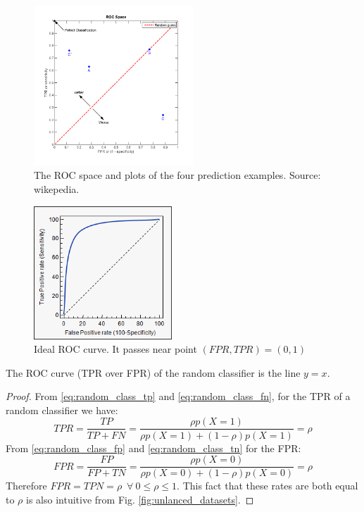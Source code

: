 \documentclass[a4paper]{article}
\begin{document}
\begin{multicols}{2}
\begin{figure}[H]
    \centering
    \includegraphics[height=6cm]{img/roc_space.png}
    \caption{The ROC space and plots of the four prediction examples. Source: wikepedia.}
\end{figure}
\columnbreak
\begin{figure}[H]
    \centering
    \includegraphics[height=5cm]{img/ideal_roc_curve.png}
    \caption{Ideal ROC curve. It passes near  point $(FPR,TPR)=(0,1)$}
\end{figure}
\end{multicols}

\begin{corollary}
The ROC curve (TPR over FPR) of the random classifier is the line $y=x$.
\end{corollary}
\begin{proof}
From \eqref{eq:random_class_tp} and \eqref{eq:random_class_fn}, for the TPR of a random classifier we have:
\[
TPR = \frac{TP}{TP+FN} = \frac{\rho p(X=1)}{\rho p(X=1) + (1-\rho)p(X=1)} = \rho \tag{1}
\]
From \eqref{eq:random_class_fp} and \eqref{eq:random_class_tn} for the FPR:
\[
FPR = \frac{FP}{FP+ TN} = \frac{\rho p(X=0)}{\rho p(X=0) + (1 -\rho )p(X=0)} = \rho \tag{2}
\]
Therefore $FPR = TPN = \rho \;\ \forall \ 0\leq \rho \leq 1$. This fact that these rates are both equal to $\rho$ is also intuitive from Fig. \ref{fig:unlanced_datasets}. 

\end{proof}
\end{document}
